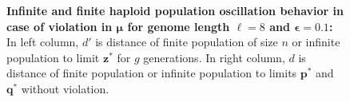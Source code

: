 \begin{figure}[h]
\begin{center}
\hspace{-3em}%
\vspace{-0.5em} \hspace{-3em}%


\caption{\textbf{Infinite and finite haploid population oscillation behavior in case of violation in $\bm{\mu}$ for genome length $\ell = 8$ and $\bm{\epsilon} = 0.1$:} 
  In left column, $d'$ is distance of finite population of size $n$ or infinite population to limit $\bm{z}^\ast$ for $g$ generations. In right column, $d$ is distance of finite population or infinite population to limits $\bm{p}^\ast$ and $\bm{q}^\ast$ without violation.}
\label{oscillation_8h_vio_mu_0.1}
\end{center}
\end{figure}

